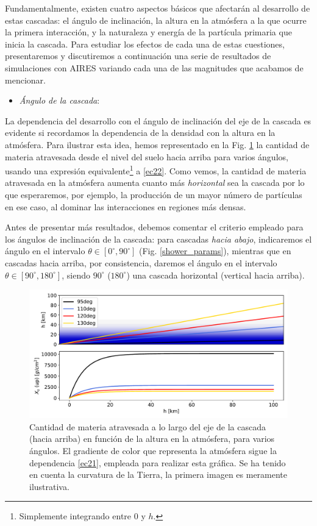 \documentclass[12 pt, a4paper]{article} %
\numberwithin{equation}{section}
\numberwithin{figure}{section}
\numberwithin{table}{section}
\begin{document}
Fundamentalmente, existen cuatro aspectos básicos que afectarán al desarrollo de estas cascadas: el ángulo de inclinación, la altura en la atmósfera a la que ocurre la primera interacción, y la naturaleza y energía de la partícula primaria que inicia la cascada. Para estudiar los efectos de cada una de estas cuestiones, presentaremos y discutiremos a continuación una serie de resultados de simulaciones con AIRES variando cada una de las magnitudes que acabamos de mencionar.
\begin{itemize}
	\item \textit{Ángulo de la cascada}:
\end{itemize}
	La dependencia del desarrollo con el ángulo de inclinación del eje de la cascada es evidente si recordamos la dependencia de la densidad con la altura en la atmósfera. Para ilustrar esta idea, hemos representado en la Fig. \ref{Profatravesadavsang} la cantidad de materia atravesada desde el nivel del suelo hacia arriba para varios ángulos, usando una expresión equivalente\footnote{ Simplemente integrando entre $0$ y $h$.} a \eqref{ec22}. Como vemos, la cantidad de materia atravesada en la atmósfera aumenta cuanto más \textit{horizontal} sea la cascada por lo que esperaremos, por ejemplo, la producción de un mayor número de partículas en ese caso, al dominar las interacciones en regiones más densas.
	
	Antes de presentar más resultados, debemos comentar el criterio empleado para los ángulos de inclinación de la cascada: para cascadas \textit{hacia abajo}, indicaremos el ángulo en el intervalo $\theta\in[0^\circ, 90^\circ]$ (Fig. \ref{shower_params}), mientras que en cascadas hacia arriba, por consistencia, daremos el ángulo en el intervalo  $\theta\in[90^\circ, 180^\circ]$, siendo $
	90^\circ$ ($180^\circ$) una cascada horizontal (vertical hacia arriba).
\clearpage
	\begin{figure}[H]
		\centering
		\includegraphics[width=.7\linewidth]{figures/cascadas/Profatravesadavsang}
		\caption{Cantidad de materia atravesada a lo largo del eje de la cascada (hacia arriba) en función de la altura en la atmósfera, para varios ángulos. El gradiente de color que representa la atmósfera sigue la dependencia \eqref{ec21}, empleada para realizar esta gráfica. Se ha tenido en cuenta la curvatura de la Tierra,  la primera imagen es meramente ilustrativa.}
		\label{Profatravesadavsang}
	\end{figure}
\end{document}
